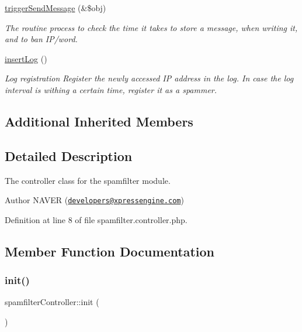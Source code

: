 \begin{DoxyCompactItemize}
\hyperlink{classspamfilterController_ab449e4ff64d26ae0ad3660522dbd396f}{trigger\+Send\+Message} (\&\$obj)
\begin{DoxyCompactList}\small\item\em The routine process to check the time it takes to store a message, when writing it, and to ban I\+P/word. \end{DoxyCompactList}\item 
\hyperlink{classspamfilterController_a14e2968cb7b9688a6b59b4f02a54a743}{insert\+Log} ()
\begin{DoxyCompactList}\small\item\em Log registration Register the newly accessed IP address in the log. In case the log interval is withing a certain time, register it as a spammer. \end{DoxyCompactList}\end{DoxyCompactItemize}
\subsection*{Additional Inherited Members}


\subsection{Detailed Description}
The controller class for the spamfilter module. 

\begin{DoxyAuthor}{Author}
N\+A\+V\+ER (\href{mailto:developers@xpressengine.com}{\tt developers@xpressengine.\+com}) 
\end{DoxyAuthor}


Definition at line 8 of file spamfilter.\+controller.\+php.



\subsection{Member Function Documentation}
\hypertarget{classspamfilterController_a8204da601e789d60dbdfe0f692537e70}{}\label{classspamfilterController_a8204da601e789d60dbdfe0f692537e70} 
\subsubsection{\texorpdfstring{init()}{init()}}
{\footnotesize\ttfamily spamfilter\+Controller\+::init (\begin{DoxyParamCaption}{ }\end{DoxyParamCaption})}



